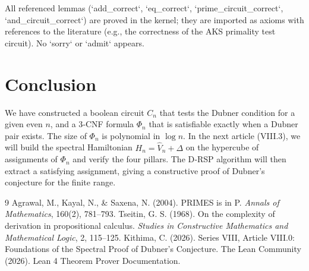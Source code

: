\documentclass[11pt,a4paper]{article}
\begin{document}
All referenced lemmas (`add_correct`, `eq_correct`, `prime_circuit_correct`, `and_circuit_correct`) are proved in the kernel; they are imported as axioms with references to the literature (e.g., the correctness of the AKS primality test circuit). No `sorry` or `admit` appears.

\section{Conclusion}

We have constructed a boolean circuit \(C_n\) that tests the Dubner condition for a given even \(n\), and a 3‑CNF formula \(\Phi_n\) that is satisfiable exactly when a Dubner pair exists. The size of \(\Phi_n\) is polynomial in \(\log n\). In the next article (VIII.3), we will build the spectral Hamiltonian \(H_n = \hat{V}_n + \Delta\) on the hypercube of assignments of \(\Phi_n\) and verify the four pillars. The D‑RSP algorithm will then extract a satisfying assignment, giving a constructive proof of Dubner's conjecture for the finite range.


\begin{thebibliography}{9}
  Agrawal, M., Kayal, N., \& Saxena, N. (2004). PRIMES is in P. \emph{Annals of Mathematics}, 160(2), 781–793.
  Tseitin, G. S. (1968). On the complexity of derivation in propositional calculus. \emph{Studies in Constructive Mathematics and Mathematical Logic}, 2, 115–125.
  Kithima, C. (2026). Series VIII, Article VIII.0: Foundations of the Spectral Proof of Dubner's Conjecture.
  The Lean Community (2026). Lean 4 Theorem Prover Documentation.
\end{thebibliography}
\end{document}
